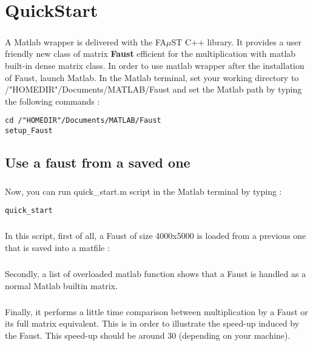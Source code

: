 \chapter{QuickStart}\label{sec:firstUse}


\paragraph{}A Matlab wrapper is delivered with the FA$\mu$ST C++ library.
It provides a user friendly new class of matrix \textbf{Faust} efficient for the multiplication with matlab built-in dense matrix class.\newline
In order to use matlab wrapper after the installation of Faust, launch Matlab.
In the Matlab terminal, set your working directory to /"HOMEDIR"/Documents/MATLAB/Faust and set the Matlab path by typing the following commands :

\begin{lstlisting}
cd /"HOMEDIR"/Documents/MATLAB/Faust
setup_Faust
\end{lstlisting}

\section{Use a faust from a saved one}\label{sec:firstUseBuildFromSave}
\paragraph{} Now, you can run quick\_start.m script in the Matlab terminal by typing :
\begin{lstlisting}
quick_start
\end{lstlisting}
\paragraph{}In this script, first of all, a Faust of size 4000x5000 is loaded from a previous one that is saved into a matfile :

\paragraph{}Secondly, a list of overloaded matlab function shows that a Faust is handled as a normal Matlab builtin matrix.
 


\paragraph{}Finally, it performs a little time comparison between multiplication by a Faust or its full matrix equivalent.
This is in order to illustrate the speed-up induced by the Faust. This speed-up should be around 30 (depending on your machine).




